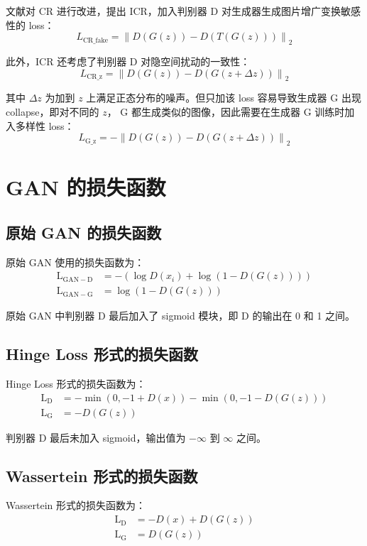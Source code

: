 文献对 CR 进行改进，提出 ICR，加入判别器 D 对生成器生成图片增广变换敏感性的 loss：
\begin{equation}
  L_{\mathrm{CR\_fake}} = \left\| D(G(z)) - D(T(G(z))) \right\|_2
\end{equation}

此外，ICR 还考虑了判别器 D 对隐空间扰动的一致性：
\begin{equation}
  L_{\mathrm{CR\_z}} = \left\| D(G(z)) - D(G(z+\Delta z)) \right\|_2
\end{equation}

其中 $\Delta z$ 为加到 $z$ 上满足正态分布的噪声。但只加该 loss 容易导致生成器 G
出现 collapse，即对不同的 $z$， G 都生成类似的图像，因此需要在生成器 G 训练时加
入多样性 loss：
\begin{equation}
  L_{\mathrm{G\_z}} = -\left\| D(G(z)) - D(G(z+\Delta z)) \right\|_2
\end{equation}

\section{GAN 的损失函数}
\subsection{原始 GAN 的损失函数}
原始 GAN 使用的损失函数为：
\begin{align}
  \label{equ:origin-GAN-loss}
  \mathrm{L}_{\mathrm{GAN-D}} & = - \left( \log D(x_i) + \log (1-D(G(z))) \right ) \\
  \mathrm{L}_{\mathrm{GAN-G}} & = \log (1-D(G(z)))
\end{align}

原始 GAN 中判别器 D 最后加入了 sigmoid 模块，即 D 的输出在 0 和 1 之间。

\subsection{Hinge Loss 形式的损失函数}
Hinge Loss 形式的损失函数为：
\begin{align}
  \label{equ:Hinge-GAN-loss}
  \mathrm{L}_{\mathrm{D}} & = -\min(0, -1 + D(x)) - \min(0, -1-D(G(z))) \\
  \mathrm{L}_{\mathrm{G}} & = -D(G(z))
\end{align}

判别器 D 最后未加入 sigmoid，输出值为 $-\infty$ 到 $\infty$ 之间。

\subsection{Wassertein 形式的损失函数}
Wassertein 形式的损失函数为：
\begin{align}
  \label{equ:WGAN-loss}
  \mathrm{L}_{\mathrm{D}} & = -D(x) + D(G(z)) \\
  \mathrm{L}_{\mathrm{G}} & = D(G(z))
\end{align}

